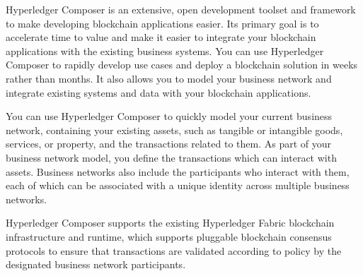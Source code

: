 Hyperledger Composer is an extensive, open development toolset and framework to make developing blockchain applications easier. Its primary goal is to accelerate time to value and make it easier to integrate your blockchain applications with the existing business systems. You can use Hyperledger Composer to rapidly develop use cases and deploy a blockchain solution in weeks rather than months. It also allows you to model your business network and integrate existing systems and data with your blockchain applications.

You can use Hyperledger Composer to quickly model your current business network, containing your existing assets, such as tangible or intangible goods, services, or property, and the transactions related to them. As part of your business network model, you define the transactions which can interact with assets. Business networks also include the participants who interact with them, each of which can be associated with a unique identity across multiple business networks.

Hyperledger Composer supports the existing Hyperledger Fabric blockchain infrastructure and runtime, which supports pluggable blockchain consensus protocols to ensure that transactions are validated according to policy by the designated business network participants.
